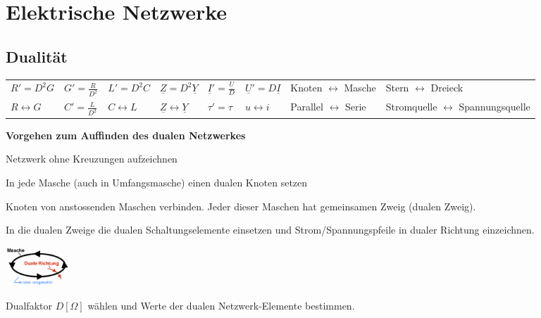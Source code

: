 \section{Elektrische Netzwerke}
\subsection{Dualität}
\begin{tabular}{llllllll}
$R'=D^2G$ & $G'=\frac{R}{D^2}$ & $L'=D^2C$ &  $\underline{Z} = D^2 \underline{Y}$ & $\underline{I}'=\frac{\underline{U}}{D}$ & $\underline{U}'=D\underline{I}$ &  Knoten $\leftrightarrow$ Masche & Stern $\leftrightarrow$ Dreieck \\
$R \leftrightarrow G $ & $C'=\frac{L}{D^2}$ & $C \leftrightarrow L$ & $\underline{Z} \leftrightarrow \underline{Y}$ & $\tau' = \tau$ & $u \leftrightarrow i$ & Parallel $\leftrightarrow$
Serie & Stromquelle $\leftrightarrow$ Spannungsquelle\\
\end{tabular}

\textbf{Vorgehen zum Auffinden des dualen Netzwerkes}
\begin{enumerate}[itemsep=1ex, nosep]
	\item Netzwerk ohne Kreuzungen aufzeichnen
	\item In jede Masche (auch in Umfangsmasche) einen dualen Knoten setzen
	\item Knoten von anstossenden Maschen verbinden. Jeder dieser Maschen hat
	gemeinsamen Zweig (dualen Zweig).\\
	\begin{minipage}{14cm}
		\item In die dualen Zweige die dualen Schaltungselemente einsetzen und Strom/Spannungspfeile in dualer Richtung einzeichnen.
	\end{minipage}
	\parbox[c]{2.5cm}{
		\includegraphics[width = 2.5cm]{./bilder/Duale_Richtung}}
	\item Dualfaktor $D [\Omega]$ wählen und Werte der dualen Netzwerk-Elemente
	bestimmen.
	
\end{enumerate}

